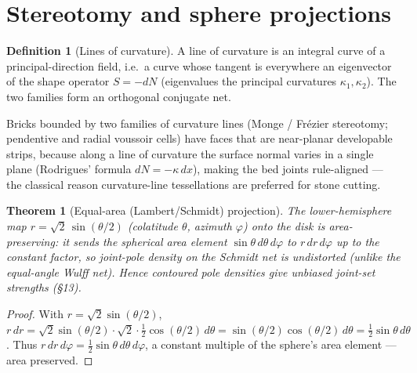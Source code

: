 \documentclass[11pt]{article}
\theoremstyle{definition}\newtheorem{definition}{Definition}[section]
\theoremstyle{plain}\newtheorem{theorem}{Theorem}[section]
\begin{document}
\section{Stereotomy and sphere projections}
\begin{definition}[Lines of curvature]
A line of curvature is an integral curve of a principal-direction field, i.e.\ a curve whose tangent is
everywhere an eigenvector of the shape operator $S=-dN$ (eigenvalues the principal curvatures
$\kappa_1,\kappa_2$). The two families form an orthogonal conjugate net.
\end{definition}
\begin{proposition}
Bricks bounded by two families of curvature lines (Monge / Frézier stereotomy; pendentive and radial voussoir
cells) have faces that are near-planar developable strips, because along a line of curvature the surface
normal varies in a single plane (Rodrigues' formula $dN=-\kappa\,dx$), making the bed joints rule-aligned ---
the classical reason curvature-line tessellations are preferred for stone cutting.
\end{proposition}
\begin{theorem}[Equal-area (Lambert/Schmidt) projection]\label{thm:lambert}
The lower-hemisphere map $r=\sqrt2\,\sin(\theta/2)$ (colatitude $\theta$, azimuth $\varphi$) onto the disk is
area-preserving: it sends the spherical area element $\sin\theta\,d\theta\,d\varphi$ to $r\,dr\,d\varphi$ up to
the constant factor, so joint-pole \emph{density} on the Schmidt net is undistorted (unlike the equal-angle
Wulff net). Hence contoured pole densities give unbiased joint-set strengths (\S13).
\end{theorem}
\begin{proof}
With $r=\sqrt2\sin(\theta/2)$, $r\,dr=\sqrt2\sin(\theta/2)\cdot\sqrt2\cdot\tfrac12\cos(\theta/2)\,d\theta
=\sin(\theta/2)\cos(\theta/2)\,d\theta=\tfrac12\sin\theta\,d\theta$. Thus $r\,dr\,d\varphi=\tfrac12\sin\theta
\,d\theta\,d\varphi$, a constant multiple of the sphere's area element --- area preserved.
\end{proof}
\end{document}
